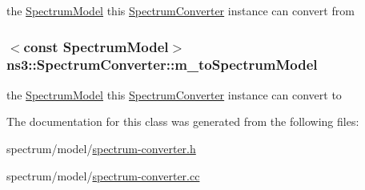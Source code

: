 the \hyperlink{classns3_1_1SpectrumModel}{Spectrum\+Model} this \hyperlink{classns3_1_1SpectrumConverter}{Spectrum\+Converter} instance can convert from 

\subsubsection[{\texorpdfstring{m\+\_\+to\+Spectrum\+Model}{m_toSpectrumModel}}]{$<$const {\bf Spectrum\+Model}$>$ ns3\+::\+Spectrum\+Converter\+::m\+\_\+to\+Spectrum\+Model\hspace{0.3cm}{\ttfamily [private]}}\hypertarget{classns3_1_1SpectrumConverter_aa99d9ccf13de156a7691b5c12e34a3dc}{}\label{classns3_1_1SpectrumConverter_aa99d9ccf13de156a7691b5c12e34a3dc}


the \hyperlink{classns3_1_1SpectrumModel}{Spectrum\+Model} this \hyperlink{classns3_1_1SpectrumConverter}{Spectrum\+Converter} instance can convert to 



The documentation for this class was generated from the following files\+:\begin{DoxyCompactItemize}
\item 
spectrum/model/\hyperlink{spectrum-converter_8h}{spectrum-\/converter.\+h}\item 
spectrum/model/\hyperlink{spectrum-converter_8cc}{spectrum-\/converter.\+cc}\end{DoxyCompactItemize}

